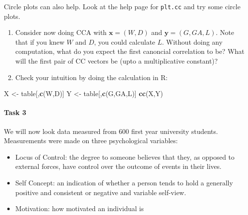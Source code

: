 \documentclass[
]{book}
\newenvironment{Shaded}{\begin{snugshade}}{\end{snugshade}}
\newcommand{\FunctionTok}[1]{\textcolor[rgb]{0.13,0.29,0.53}{\textbf{#1}}}
\newcommand{\NormalTok}[1]{#1}
\newcommand{\OtherTok}[1]{\textcolor[rgb]{0.56,0.35,0.01}{#1}}
\newcommand{\StringTok}[1]{\textcolor[rgb]{0.31,0.60,0.02}{#1}}
\providecommand{\tightlist}{%
  \setlength{\itemsep}{0pt}\setlength{\parskip}{0pt}}
\theoremstyle{definition}
\theoremstyle{definition}
\theoremstyle{definition}
\theoremstyle{definition}
\theoremstyle{remark}
\begin{document}
Circle plots can also help. Look at the help page for \texttt{plt.cc} and try some circle plots.

\begin{enumerate}
\def\labelenumi{\roman{enumi}.}
\setcounter{enumi}{2}
\item
  Consider now doing CCA with \(\mathbf x=(W,D)\) and \(\mathbf y=(G,GA, L)\). Note that if you knew \(W\) and \(D\), you could calculate \(L\). Without doing any computation, what do you expect the first canoncial correlation to be? What will the first pair of CC vectors be (upto a multiplicative constant)?
\item
  Check your intuition by doing the calculation in R:
\end{enumerate}

\begin{Shaded}
\begin{Highlighting}[]
\NormalTok{X }\OtherTok{\textless{}{-}}\NormalTok{ table[,}\FunctionTok{c}\NormalTok{(}\StringTok{\textquotesingle{}W\textquotesingle{}}\NormalTok{,}\StringTok{\textquotesingle{}D\textquotesingle{}}\NormalTok{)] }
\NormalTok{Y }\OtherTok{\textless{}{-}}\NormalTok{ table[,}\FunctionTok{c}\NormalTok{(}\StringTok{\textquotesingle{}G\textquotesingle{}}\NormalTok{,}\StringTok{\textquotesingle{}GA\textquotesingle{}}\NormalTok{,}\StringTok{\textquotesingle{}L\textquotesingle{}}\NormalTok{)] }
\FunctionTok{cc}\NormalTok{(X,Y)}
\end{Highlighting}
\end{Shaded}

\paragraph*{Task 3}\label{task-3}

We will now look data measured from 600 first year university students. Measurements were made on three psychological variables:

\begin{itemize}
\tightlist
\item
  Locus of Control: the degree to someone believes that they, as opposed to external forces, have control over the outcome of events in their lives.
\item
  Self Concept: an indication of whether a person tends to hold a generally positive and consistent or negative and variable self-view.
\item
  Motivation: how motivated an individual is
\end{itemize}
\end{document}
